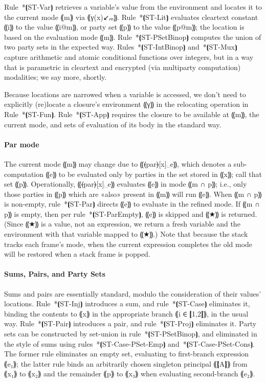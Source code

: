 Rule~*⦗ST-Var⦘ retrieves a variable's value from the environment and
locates it to the current mode ⸨m⸩ via ⸨γ(x)↙ₘ⸩. Rule~*⦗ST-Lit⦘ evaluates
cleartext constant ⸨i⸩ to the value ⸨i@m⸩, or party set ⸨p⸩ to the value ⸨p@m⸩;
the location is based on the evaluation mode ⸨m⸩.  Rule~*⦗ST-PSetBinop⦘ computes
the union of two party sets in the expected way. Rules~*⦗ST-IntBinop⦘
and~*⦗ST-Mux⦘ capture arithmetic and atomic conditional functions over integers,
but in a way that is parametric in cleartext and encrypted (via multiparty
computation) modalities; we say more, shortly.

Because locations are narrowed when a variable is accessed, we don't need to
explicitly (re)locate a closure's environment ⸨γ⸩ in the relocating
operation in Rule~*⦗ST-Fun⦘. Rule~*⦗ST-App⦘ requires the closure to be available at ⸨m⸩,
the current mode, and sets of evaluation of its body in the standard way.

\paragraph*{Par mode}

The current mode ⸨m⸩ may change due to ⸨⦑par⦒[x]␣e⸩, which denotes a
sub-computation ⸨e⸩ to be evaluated only by parties in the set stored
in ⸨x⸩; call that set ⸨p⸩. Operationally, ⸨⦑par⦒[x]␣e⸩ evaluates ⸨e⸩ in mode
⸨m ∩ p⸩; i.e., only those parties in ⸨p⸩ which are «also» present in ⸨m⸩ will run ⸨e⸩.
When ⸨m ∩ p⸩ is non-empty, rule~*⦗ST-Par⦘ directs ⸨e⸩ to evaluate in the refined mode.
If ⸨m ∩ p⸩ is empty, then per rule~*⦗ST-ParEmpty⦘, ⸨e⸩ is skipped and ⸨★⸩ is returned.
(Since ⸨★⸩ is a value, not an expression, we return a fresh variable and the
environment with that variable mapped to ⸨★⸩.) Note that because the stack
tracks each frame's mode, when the current expression completes the old
mode will be restored when a stack frame is popped.

\paragraph*{Sums, Pairs, and Party Sets}

Sums and pairs are essentially standard, modulo the consideration of their values' locations.
%
Rule~*⦗ST-Inj⦘ introduces a sum, and rule~*⦗ST-Case⦘ eliminates it, binding the
contents to ⸨x⸩ in the appropriate branch ⸨i ∈ ❴1,2❵⸩, in the usual way.
%
Rule~*⦗ST-Pair⦘ introduces a pair, and rule~*⦗ST-Proj⦘ eliminates it.
%
Party sets can be constructed by set-union in rule~*⦗ST-PSetBinop⦘,
and eliminated in the style of sums using rules~*⦗ST-Case-PSet-Emp⦘
and~*⦗ST-Case-PSet-Cons⦘. The former rule eliminates an empty set,
evaluating to first-branch expression ⸨e₁⸩; the latter rule binds an
arbitrarily chosen singleton principal ⸨❴A❵⸩ from ⸨x₁⸩ to ⸨x₂⸩ and the
remainder ⸨p⸩ to ⸨x₃⸩ when evaluating second-branch ⸨e₂⸩.


